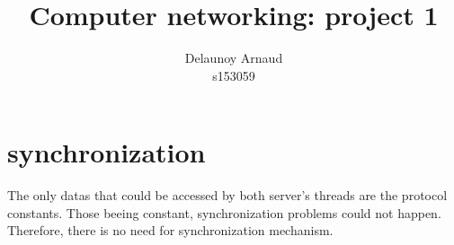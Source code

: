 \documentclass[11pt]{article}
\title{Computer networking: project 1}
\author{Delaunoy Arnaud \\ s153059}
\date{}
\begin{document}
\begin{titlepage}
\maketitle
\setcounter{page}{0}
\thispagestyle{empty}
\end{titlepage}

\section{synchronization}
The only datas that could be accessed by both server's threads are the protocol constants. Those beeing constant, synchronization problems could not happen. Therefore, there is no need for synchronization mechanism.
\end{document}
